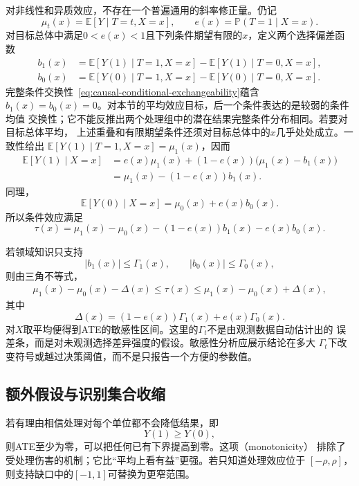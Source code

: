 对非线性和异质效应，不存在一个普遍通用的斜率修正量。仍记
\[
  \mu_t(x)=\mathbb{E}[Y\mid T=t,X=x],\qquad
  e(x)=\mathbb{P}(T=1\mid X=x).
\]
对目标总体中满足\(0<e(x)<1\)且下列条件期望有限的\(x\)，定义两个选择偏差函数
\begin{align*}
  b_1(x)
  &=
  \mathbb{E}[Y(1)\mid T=1,X=x]
  -
  \mathbb{E}[Y(1)\mid T=0,X=x],\\
  b_0(x)
  &=
  \mathbb{E}[Y(0)\mid T=1,X=x]
  -
  \mathbb{E}[Y(0)\mid T=0,X=x].
\end{align*}
完整条件交换性~\eqref{eq:causal-conditional-exchangeability}蕴含
\(b_1(x)=b_0(x)=0\)。对本节的平均效应目标，后一个条件表达的是较弱的条件均值
交换性；它不能反推出两个处理组中的潜在结果完整条件分布相同。若要对目标总体平均，
上述重叠和有限期望条件还须对目标总体中的\(x\)几乎处处成立。一致性给出
\(\mathbb{E}[Y(1)\mid T=1,X=x]=\mu_1(x)\)，因而
\[
\begin{aligned}
  \mathbb{E}[Y(1)\mid X=x]
  &=
  e(x)\mu_1(x)
  +(1-e(x))\bigl(\mu_1(x)-b_1(x)\bigr)\\
  &=
  \mu_1(x)-(1-e(x))b_1(x).
\end{aligned}
\]
同理，
\[
  \mathbb{E}[Y(0)\mid X=x]
  =
  \mu_0(x)+e(x)b_0(x).
\]
所以条件效应满足
\begin{equation}
  \tau(x)
  =
  \mu_1(x)-\mu_0(x)
  -(1-e(x))b_1(x)-e(x)b_0(x).
  \label{eq:causal-selection-bias-function}
\end{equation}

若领域知识只支持
\[
  |b_1(x)|\leq\Gamma_1(x),\qquad
  |b_0(x)|\leq\Gamma_0(x),
\]
则由三角不等式，
\begin{align}
  \mu_1(x)-\mu_0(x)-\Delta(x)
  \leq\tau(x)
  \leq
  \mu_1(x)-\mu_0(x)+\Delta(x),
  \label{eq:causal-sensitivity-bounds}
\end{align}
其中
\[
  \Delta(x)
  =
  (1-e(x))\Gamma_1(x)+e(x)\Gamma_0(x).
\]
对\(X\)取平均便得到ATE的敏感性区间。这里的\(\Gamma_t\)不是由观测数据自动估计出的
误差条，而是对未观测选择差异强度的假设。敏感性分析应展示结论在多大
\(\Gamma_t\)下改变符号或越过决策阈值，而不是只报告一个方便的参数值。

\subsection{额外假设与识别集合收缩}

若有理由相信处理对每个单位都不会降低结果，即
\[
  Y(1)\geq Y(0),
\]
则ATE至少为零，可以把任何已有下界提高到零。这项（monotonicity）
排除了受处理伤害的机制；它比“平均上看有益”更强。若只知道处理效应位于
\([-\rho,\rho]\)，则支持缺口中的\([-1,1]\)可替换为更窄范围。

